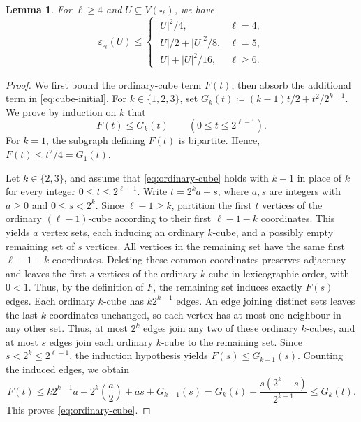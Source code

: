 \documentclass[11pt]{article}
\numberwithin{equation}{section}
\newtheorem{lemma}[lemma]{Lemma}
\begin{document}
\begin{lemma}\label{lem:cube}
For \(\ell\ge4\) and \(U\subseteq V(\square_\ell)\), we have
\[
 \varepsilon_{\square_\ell}(U)\le
 \begin{cases}
 |U|^2/4,&\ell=4,\\
 |U|/2+|U|^2/8,&\ell=5,\\
 |U|+|U|^2/16,&\ell\ge6.
 \end{cases}
\]
\end{lemma}
\begin{proof}
We first bound the ordinary-cube term \(F(t)\), then absorb
the additional term in \eqref{eq:cube-initial}.
For \(k\in\{1,2,3\}\), set
\(G_k(t)\coloneqq(k-1)t/2+t^2/2^{k+1}\). We prove by induction on \(k\) that
\begin{equation}\label{eq:ordinary-cube}
 F(t)\le G_k(t)\qquad(0\le t\le2^{\ell-1}).
\end{equation}
For \(k=1\), the subgraph defining \(F(t)\) is bipartite.
Hence, \(F(t)\le t^2/4=G_1(t)\).

Let \(k\in\{2,3\}\), and assume that \eqref{eq:ordinary-cube} holds
with \(k-1\) in place of \(k\) for every integer \(0\le t\le2^{\ell-1}\).
Write \(t=2^k a+s\), where \(a,s\) are integers with \(a\ge0\) and \(0\le s<2^k\).
Since \(\ell-1\ge k\), partition the first \(t\) vertices of the ordinary
\((\ell-1)\)-cube according to their first \(\ell-1-k\) coordinates.
This yields \(a\) vertex sets, each inducing an ordinary \(k\)-cube,
and a possibly empty remaining set of \(s\) vertices.
All vertices in the remaining set have the same first \(\ell-1-k\) coordinates.
Deleting these common coordinates preserves adjacency and leaves the first
\(s\) vertices of the ordinary \(k\)-cube in lexicographic order, with \(0<1\).
Thus, by the definition of \(F\), the remaining set induces exactly \(F(s)\) edges.
Each ordinary \(k\)-cube has \(k2^{k-1}\) edges.
An edge joining distinct sets leaves the last \(k\) coordinates unchanged,
so each vertex has at most one neighbour in any other set.
Thus, at most \(2^k\) edges join any two of these ordinary \(k\)-cubes,
and at most \(s\) edges join each ordinary \(k\)-cube to the remaining set.
Since \(s<2^k\le2^{\ell-1}\), the induction hypothesis yields
\(F(s)\le G_{k-1}(s)\).
Counting the induced edges, we obtain
\[
 F(t)\le k2^{k-1}a+2^k\binom a2+as+G_{k-1}(s)=G_k(t)-\frac{s(2^k-s)}{2^{k+1}}\le G_k(t).
\]
This proves \eqref{eq:ordinary-cube}.


\end{proof}
\end{document}
